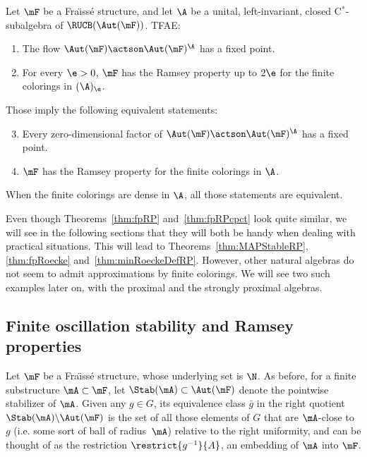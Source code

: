 \begin{theo}\label{thm:fpRPcpct}
Let $\mF$ be a Fra\"{\i}ss\'e structure, and let $\A$ be a unital, left-invariant, closed C$^{*}$-subalgebra of $\RUCB(\Aut(\mF))$. TFAE:
\begin{enumerate}
\item \label{3.1.1} The flow $\Aut(\mF)\actson \Aut(\mF)^{\A}$ has a fixed point.
\item \label{3.1.2} For every $\e>0$, $\mF$ has the Ramsey property up to $2\e$ for the finite colorings in $(\A)_{\e}$.
\end{enumerate}

Those imply the following equivalent statements:
\begin{enumerate}
\setcounter{enumi}{2}
\item \label{3.1.3} Every zero-dimensional factor of $\Aut(\mF)\actson \Aut(\mF)^{\A}$ has a fixed point.
\item \label{3.1.4} $\mF$ has the Ramsey property for the finite colorings in $\A$.
\end{enumerate}

When the finite colorings are dense in $\A$, all those statements are equivalent.
\end{theo}

Even though Theorems~\ref{thm:fpRP} and~\ref{thm:fpRPcpct} look quite similar, we will see in the following sections that they will both be handy when dealing with practical situations. This will lead to Theorems~\ref{thm:MAPStableRP}, \ref{thm:fpRoecke} and~\ref{thm:minRoeckeDefRP}. However, other natural algebras do not seem to admit approximations by finite colorings. We will see two such examples later on, with the proximal and the strongly proximal algebras.

\subsection{Finite oscillation stability and Ramsey properties}
\label{section:colorings}

Let $\mF$ be a Fra\"{\i}ss\'e structure, whose underlying set is $\N$. As before, for a finite substructure $\mA \subset \mF$, let $\Stab(\mA) \subset \Aut(\mF)$ denote the pointwise stabilizer of $\mA$. Given any $g\in G$, its equivalence class $\bar g$ in the right quotient $\Stab(\mA)\backslash \Aut(\mF)$ is the set of all those elements of $G$ that are $\mA$-close to $g$ (i.e. some sort of ball of radius~$\mA$) relative to the right uniformity, and can be thought of as the restriction $\restrict{g^{-1}}{A}$, an embedding of $\mA$ into $\mF$.


